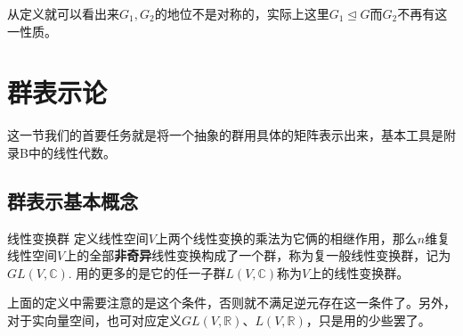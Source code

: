 从定义就可以看出来$G_1,G_2$的地位不是对称的，实际上这里$G_1\unlhd G$而$G_2$不再有这一性质。

\section{群表示论}
这一节我们的首要任务就是将一个抽象的群用具体的矩阵表示出来，基本工具是附录B中的线性代数。
\subsection{群表示基本概念}
\begin{define}{线性变换群}
    定义线性空间$V$上两个线性变换的乘法为它俩的相继作用，那么$n$维复线性空间$V$上的全部\textbf{非奇异}线性变换构成了一个群，称为复一般线性变换群，记为$GL(V,\mathbb{C})$.
    用的更多的是它的任一子群$L(V,\mathbb{C})$称为$V$上的线性变换群。
\end{define}
上面的定义中需要注意的是这个条件，否则就不满足逆元存在这一条件了。另外，对于实向量空间，也可对应定义$GL(V,\mathbb{R})$、$L(V,\mathbb{R})$，只是用的少些罢了。

